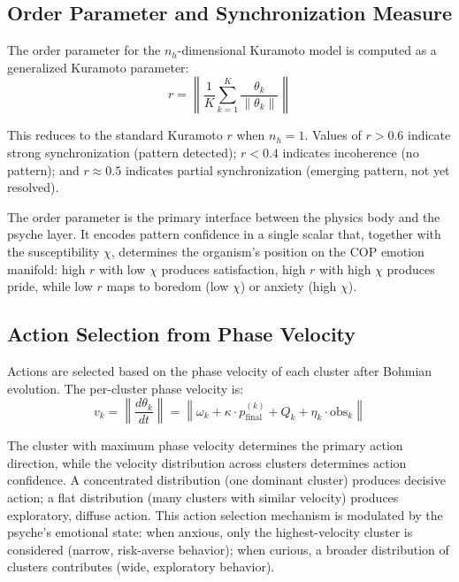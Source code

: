 \documentclass[11pt,a4paper,twocolumn]{article}
\begin{document}
\subsection{Order Parameter and Synchronization Measure}

The order parameter for the $n_h$-dimensional Kuramoto model is computed as a generalized Kuramoto parameter:
\begin{equation}
r = \left\|\frac{1}{K}\sum_{k=1}^{K} \frac{\theta_k}{\|\theta_k\|}\right\|
\label{eq:order_param}
\end{equation}

This reduces to the standard Kuramoto $r$ when $n_h = 1$.
Values of $r > 0.6$ indicate strong synchronization (pattern detected); $r < 0.4$ indicates incoherence (no pattern); and $r \approx 0.5$ indicates partial synchronization (emerging pattern, not yet resolved).

The order parameter is the primary interface between the physics body and the psyche layer.
It encodes pattern confidence in a single scalar that, together with the susceptibility $\chi$, determines the organism's position on the COP emotion manifold: high $r$ with low $\chi$ produces satisfaction, high $r$ with high $\chi$ produces pride, while low $r$ maps to boredom (low $\chi$) or anxiety (high $\chi$).

\subsection{Action Selection from Phase Velocity}

Actions are selected based on the phase velocity of each cluster after Bohmian evolution.
The per-cluster phase velocity is:
\begin{equation}
v_k = \left\|\frac{d\theta_k}{dt}\right\| = \left\|\omega_k + \kappa \cdot p_{\mathrm{final}}^{(k)} + Q_k + \eta_k \cdot \mathrm{obs}_k\right\|
\label{eq:phase_velocity}
\end{equation}

The cluster with maximum phase velocity determines the primary action direction, while the velocity distribution across clusters determines action confidence.
A concentrated distribution (one dominant cluster) produces decisive action; a flat distribution (many clusters with similar velocity) produces exploratory, diffuse action.
This action selection mechanism is modulated by the psyche's emotional state: when anxious, only the highest-velocity cluster is considered (narrow, risk-averse behavior); when curious, a broader distribution of clusters contributes (wide, exploratory behavior).
\end{document}
